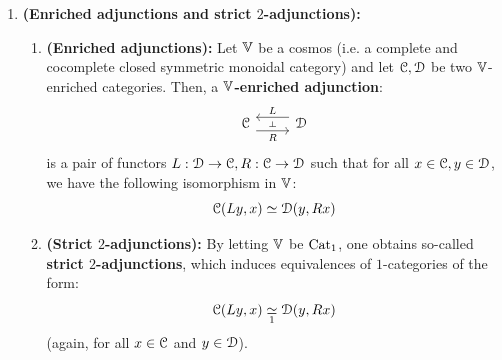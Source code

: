                 \begin{remark} \label{remark: objects_and_morphisms_of_grothendieck_constructions}
                    
                \end{remark}
                
                \begin{remark} \label{remark: 2_adjunctions}
                    \noindent
                    \begin{enumerate}
                        \item \textbf{(Enriched adjunctions and strict $2$-adjunctions):} 
                            \begin{enumerate}
                                \item \textbf{(Enriched adjunctions):} Let $\mathbb{V}$ be a cosmos (i.e. a complete and cocomplete closed symmetric monoidal category) and let $\mathcal{C}, \mathcal{D}$ be two $\mathbb{V}$-enriched categories. Then, a \textbf{$\mathbb{V}$-enriched adjunction}:
                                    $$
                                        \begin{tikzcd}
                                        	\C & \D
                                        	\arrow[""{name=0, anchor=center, inner sep=0}, "R"', shift right=2, from=1-1, to=1-2]
                                        	\arrow[""{name=1, anchor=center, inner sep=0}, "L"', shift right=2, from=1-2, to=1-1]
                                        	\arrow["\dashv"{anchor=center, rotate=-90}, draw=none, from=1, to=0]
                                        \end{tikzcd}
                                    $$
                                is a pair of functors $L: \mathcal{D} \to \mathcal{C}, R: \mathcal{C} \to \mathcal{D}$ such that for all $x \in \mathcal{C}, y \in \mathcal{D}$, we have the following isomorphism in $\mathbb{V}$:
                                    $$\mathcal{C}(Ly, x) \simeq \mathcal{D}(y, Rx)$$
                                \item \textbf{(Strict $2$-adjunctions):} By letting $\mathbb{V}$ be $\mathrm{Cat}_1$, one obtains so-called \textbf{strict $2$-adjunctions}, which induces equivalences of $1$-categories of the form:
                                    $$\mathcal{C}(Ly, x) \underset{1}{\simeq} \mathcal{D}(y, Rx)$$
                                (again, for all $x \in \mathcal{C}$ and $y \in \mathcal{D}$).
                            \end{enumerate}

\end{enumerate}
\end{remark}
